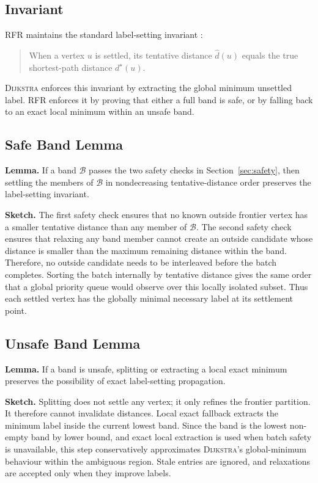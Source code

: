 \documentclass[11pt]{article}
\newcommand{\RFR}{\textsc{RFR}}
\newcommand{\Dijkstra}{\textsc{Dijkstra}}
\newcommand{\band}{\mathcal{B}}
\begin{document}
\subsection{Invariant}

\RFR{} maintains the standard label-setting invariant \cite{cormen2009}:

\begin{quote}
When a vertex $u$ is settled, its tentative distance $\hat d(u)$ equals the true shortest-path distance $d^\star(u)$.
\end{quote}

\Dijkstra{} enforces this invariant by extracting the global minimum unsettled label. \RFR{} enforces it by proving that either a full band is safe, or by falling back to an exact local minimum within an unsafe band.

\subsection{Safe Band Lemma}

\textbf{Lemma.} If a band $\band$ passes the two safety checks in Section~\ref{sec:safety}, then settling the members of $\band$ in nondecreasing tentative-distance order preserves the label-setting invariant.

\textbf{Sketch.} The first safety check ensures that no known outside frontier vertex has a smaller tentative distance than any member of $\band$. The second safety check ensures that relaxing any band member cannot create an outside candidate whose distance is smaller than the maximum remaining distance within the band. Therefore, no outside candidate needs to be interleaved before the batch completes. Sorting the batch internally by tentative distance gives the same order that a global priority queue would observe over this locally isolated subset. Thus each settled vertex has the globally minimal necessary label at its settlement point.

\subsection{Unsafe Band Lemma}

\textbf{Lemma.} If a band is unsafe, splitting or extracting a local exact minimum preserves the possibility of exact label-setting propagation.

\textbf{Sketch.} Splitting does not settle any vertex; it only refines the frontier partition. It therefore cannot invalidate distances. Local exact fallback extracts the minimum label inside the current lowest band. Since the band is the lowest non-empty band by lower bound, and exact local extraction is used when batch safety is unavailable, this step conservatively approximates \Dijkstra{}'s global-minimum behaviour within the ambiguous region. Stale entries are ignored, and relaxations are accepted only when they improve labels.
\end{document}
